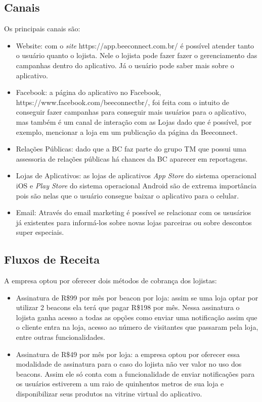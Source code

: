\subsection{Canais}
\label{cha:canais}
Os principais canais são:
\begin{itemize}
\item Website: com o \textit{site} https://app.beeconnect.com.br/ é possível atender tanto o usuário quanto o lojista. Nele o lojista pode fazer fazer o gerenciamento das campanhas dentro do aplicativo. Já o usuário pode saber mais sobre o aplicativo.
\item Facebook: a página do aplicativo no Facebook, https://www.facebook.com/beeconnectbr/, foi feita com o intuito de conseguir fazer campanhas para conseguir mais usuários para o aplicativo, mas também é um canal de interação com as Lojas dado que é possível, por exemplo, mencionar a loja em um publicação da página da Beeconnect.
\item Relações Públicas: dado que a BC faz parte do grupo TM que possui uma assessoria de relações públicas há chances da BC aparecer em reportagens.
\item Lojas de Aplicativos: as lojas de aplicativos \textit{App Store} do sistema operacional iOS e \textit{Play Store} do sistema operacional Android são de extrema importância pois são nelas que o usuário consegue baixar o aplicativo para o celular. 
\item Email: Através do email marketing é possível se relacionar com os ususários já existentes para informá-los sobre novas lojas parceiras ou sobre descontos super especiais.
\end{itemize}

\subsection{Fluxos de Receita}
\label{cha:fluxos_de_receita}
A empresa optou por oferecer dois métodos de cobrança dos lojistas:
\begin{itemize}
\item Assinatura de R\$99 por mês por beacon por loja: assim se uma loja optar por utilizar 2 beacons ela terá que pagar R\$198 por mês. Nessa assinatura o lojista ganha acesso a todas as opções como enviar uma notificação assim que o cliente entra na loja, acesso ao número de visitantes que passaram pela loja, entre outras funcionalidades.
\item Assinatura de R\$49 por mês por loja: a empresa optou por oferecer essa modalidade de assinatura para o caso do lojista não ver valor no uso dos beacons. Assim ele só conta com a funcionalidade de enviar notificações para os usuários estiverem a um raio de quinhentos metros de sua loja e disponibilizar seus produtos na vitrine virtual do aplicativo.
\end{itemize}

